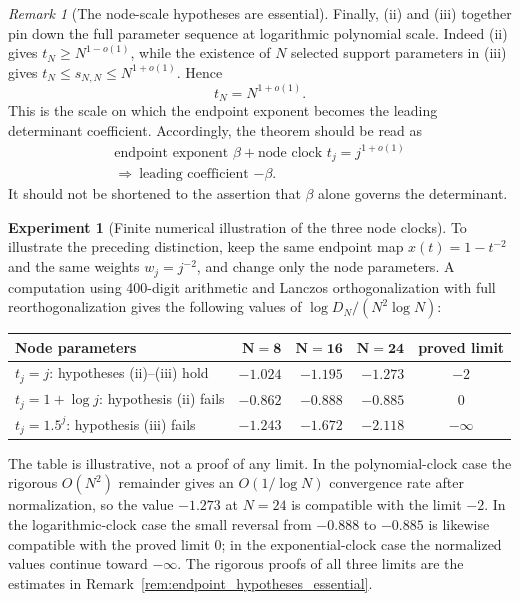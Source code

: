 \documentclass[preprint,12pt]{elsarticle}
\numberwithin{equation}{section}
\theoremstyle{plain}
\theoremstyle{definition}
\newtheorem{experiment}[theorem]{Experiment}
\theoremstyle{remark}
\newtheorem{remark}[theorem]{Remark}
\begin{document}
\begin{remark}[The node-scale hypotheses are essential]
Finally, (ii) and (iii) together pin down the full parameter sequence at logarithmic polynomial
scale.  Indeed (ii) gives \(t_N\ge N^{1-o(1)}\), while the existence of \(N\) selected support
parameters in (iii) gives \(t_N\le s_{N,N}\le N^{1+o(1)}\).  Hence
\[
\boxed{t_N=N^{1+o(1)}.}
\]
This is the scale on which the endpoint exponent becomes the leading determinant coefficient.
Accordingly, the theorem should be read as
\[
\begin{gathered}
\text{endpoint exponent \(\beta\)}
+\text{node clock \(t_j=j^{1+o(1)}\)}\\
\Longrightarrow\ \text{leading coefficient \(-\beta\)}.
\end{gathered}
\]
It should not be shortened to the assertion that \(\beta\) alone governs the determinant.
\end{remark}

\begin{experiment}[Finite numerical illustration of the three node clocks]
\label{exp:endpoint_three_clocks}
To illustrate the preceding distinction, keep the same endpoint map
\(x(t)=1-t^{-2}\) and the same weights \(w_j=j^{-2}\), and change only the node
parameters.  A computation using 400-digit arithmetic and Lanczos orthogonalization with full
reorthogonalization gives the following values of
\(\log D_N/(N^2\log N)\):
\begin{center}
\small
\begin{tabular}{p{}rrrc}
\toprule
\textbf{Node parameters} & \(\boldsymbol{N=8}\) & \(\boldsymbol{N=16}\) &
\(\boldsymbol{N=24}\) & \textbf{proved limit}\\
\midrule
\(t_j=j\): hypotheses (ii)--(iii) hold
& \(-1.024\) & \(-1.195\) & \(-1.273\) & \(-2\)\\
\(t_j=1+\log j\): hypothesis (ii) fails
& \(-0.862\) & \(-0.888\) & \(-0.885\) & \(0\)\\
\(t_j=1.5^j\): hypothesis (iii) fails
& \(-1.243\) & \(-1.672\) & \(-2.118\) & \(-\infty\)\\
\bottomrule
\end{tabular}
\end{center}
The table is illustrative, not a proof of any limit.  In the polynomial-clock case the rigorous
\(O(N^2)\) remainder gives an \(O(1/\log N)\) convergence rate after normalization, so the
value \(-1.273\) at \(N=24\) is compatible with the limit \(-2\).  In the logarithmic-clock
case the small reversal from \(-0.888\) to \(-0.885\) is likewise compatible with the proved
limit \(0\); in the exponential-clock case the normalized values continue toward
\(-\infty\).  The rigorous proofs of all three limits are the estimates in
Remark~\ref{rem:endpoint_hypotheses_essential}.
\end{experiment}
\end{document}
